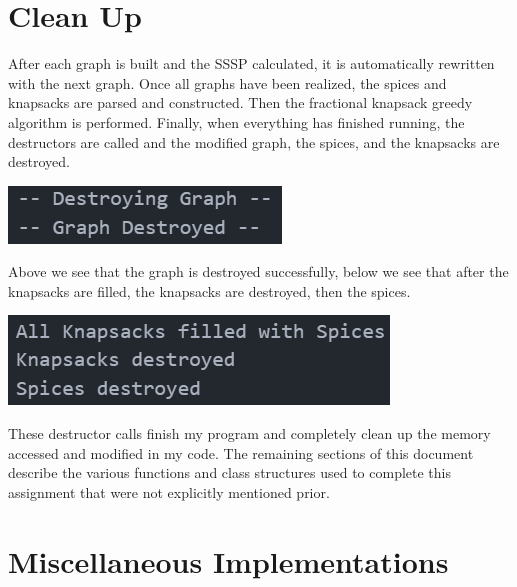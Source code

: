 \documentclass[12pt, letterpaper]{article}
\begin{document}
\section{Clean Up} \label{CleanUp}
After each graph is built and the SSSP calculated, it is automatically rewritten with the next graph.
Once all graphs have been realized, the spices and knapsacks are parsed and constructed.
Then the fractional knapsack greedy algorithm is performed.
Finally, when everything has finished running, the destructors are called and the modified graph, the spices, and the knapsacks are destroyed.
\begin{center}
   \includegraphics{images/Graph_Destruction.png}
\end{center}
Above we see that the graph is destroyed successfully, below we see that after the knapsacks are filled, the knapsacks are destroyed, then the spices.
\begin{center}
   \includegraphics{images/SpiceKnapsack_CleanUp.png}
\end{center}
These destructor calls finish my program and completely clean up the memory accessed and modified in my code.
\vspace*{5px}
\newline
The remaining sections of this document describe the various functions and class structures used to complete this assignment that were not explicitly mentioned prior.

\section{Miscellaneous Implementations} \label{MiscImp}
\end{document}
